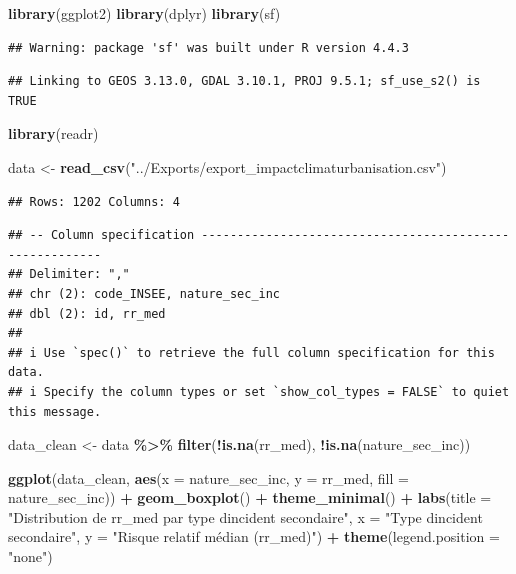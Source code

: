 \documentclass[
]{article}
\newenvironment{Shaded}{\begin{snugshade}}{\end{snugshade}}
\newcommand{\AttributeTok}[1]{\textcolor[rgb]{0.13,0.29,0.53}{#1}}
\newcommand{\FunctionTok}[1]{\textcolor[rgb]{0.13,0.29,0.53}{\textbf{#1}}}
\newcommand{\NormalTok}[1]{#1}
\newcommand{\OtherTok}[1]{\textcolor[rgb]{0.56,0.35,0.01}{#1}}
\newcommand{\SpecialCharTok}[1]{\textcolor[rgb]{0.81,0.36,0.00}{\textbf{#1}}}
\newcommand{\StringTok}[1]{\textcolor[rgb]{0.31,0.60,0.02}{#1}}
\begin{document}
\begin{Shaded}
\begin{Highlighting}[]
\FunctionTok{library}\NormalTok{(ggplot2)}
\FunctionTok{library}\NormalTok{(dplyr)}
\FunctionTok{library}\NormalTok{(sf)}
\end{Highlighting}
\end{Shaded}

\begin{verbatim}
## Warning: package 'sf' was built under R version 4.4.3
\end{verbatim}

\begin{verbatim}
## Linking to GEOS 3.13.0, GDAL 3.10.1, PROJ 9.5.1; sf_use_s2() is TRUE
\end{verbatim}

\begin{Shaded}
\begin{Highlighting}[]
\FunctionTok{library}\NormalTok{(readr)}

\NormalTok{data }\OtherTok{\textless{}{-}} \FunctionTok{read\_csv}\NormalTok{(}\StringTok{"../Exports/export\_impactclimaturbanisation.csv"}\NormalTok{)}
\end{Highlighting}
\end{Shaded}

\begin{verbatim}
## Rows: 1202 Columns: 4
\end{verbatim}

\begin{verbatim}
## -- Column specification --------------------------------------------------------
## Delimiter: ","
## chr (2): code_INSEE, nature_sec_inc
## dbl (2): id, rr_med
## 
## i Use `spec()` to retrieve the full column specification for this data.
## i Specify the column types or set `show_col_types = FALSE` to quiet this message.
\end{verbatim}

\begin{Shaded}
\begin{Highlighting}[]
\NormalTok{data\_clean }\OtherTok{\textless{}{-}}\NormalTok{ data }\SpecialCharTok{\%\textgreater{}\%}
  \FunctionTok{filter}\NormalTok{(}\SpecialCharTok{!}\FunctionTok{is.na}\NormalTok{(rr\_med), }\SpecialCharTok{!}\FunctionTok{is.na}\NormalTok{(nature\_sec\_inc))}

\FunctionTok{ggplot}\NormalTok{(data\_clean, }\FunctionTok{aes}\NormalTok{(}\AttributeTok{x =}\NormalTok{ nature\_sec\_inc, }\AttributeTok{y =}\NormalTok{ rr\_med, }\AttributeTok{fill =}\NormalTok{ nature\_sec\_inc)) }\SpecialCharTok{+}
  \FunctionTok{geom\_boxplot}\NormalTok{() }\SpecialCharTok{+}
  \FunctionTok{theme\_minimal}\NormalTok{() }\SpecialCharTok{+}
  \FunctionTok{labs}\NormalTok{(}\AttributeTok{title =} \StringTok{"Distribution de rr\_med par type d\textquotesingle{}incident secondaire"}\NormalTok{,}
       \AttributeTok{x =} \StringTok{"Type d\textquotesingle{}incident secondaire"}\NormalTok{,}
       \AttributeTok{y =} \StringTok{"Risque relatif médian (rr\_med)"}\NormalTok{) }\SpecialCharTok{+}
  \FunctionTok{theme}\NormalTok{(}\AttributeTok{legend.position =} \StringTok{"none"}\NormalTok{)}
\end{Highlighting}
\end{Shaded}
\end{document}
